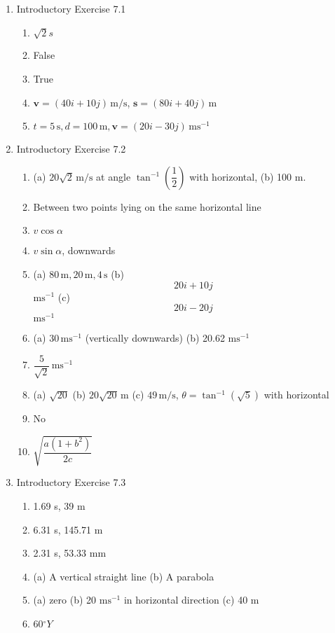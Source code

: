 \documentclass{article}
\renewcommand{\frac}[2]{\dfrac{#1}{#2}}
\begin{document}
\begin{enumerate}
    \item Introductory Exercise 7.1
    \begin{enumerate}
      \item $\sqrt{2} s$
      \item False
      \item True
      \item $\mathbf{v} = (40i + 10j) \, \text{m/s}$, $\mathbf{s} = (80i + 40j) \, \text{m}$
      \item $t = 5 \, \text{s}, d = 100 \, \text{m}, \mathbf{v} = (20i - 30j) \, \text{ms}^{-1}$
    \end{enumerate}
  
    \item Introductory Exercise 7.2
    \begin{enumerate}
      \item (a) $20\sqrt{2} \, \text{m/s}$ at angle $\tan^{-1}\left(\frac{1}{2}\right)$ with horizontal, (b) 100 m.
      \item Between two points lying on the same horizontal line
      \item $v \cos \alpha$
      \item $v \sin \alpha$, downwards
      \item (a) $80 \, \text{m}, 20 \, \text{m}, 4 \, \text{s}$ (b) \[20i + 10j\] $\text{ms}^{-1}$ (c) \[20i - 20j\] $\text{ms}^{-1}$
      \item (a) $30 \, \text{ms}^{-1}$ (vertically downwards) (b) 20.62 $\text{ms}^{-1}$
      \item $\frac{5}{\sqrt{2}} \, \text{ms}^{-1}$
      \item (a) $\sqrt{20}$ (b) $20\sqrt{20} \, \text{m}$ (c) $49 \, \text{m/s}$, $\theta = \tan^{-1}(\sqrt{5})$ with horizontal
      \item No
      \item $\sqrt{\frac{a(1+b^{2})}{2c}}$
    \end{enumerate}
  
    \item Introductory Exercise 7.3
    \begin{enumerate}
      \item 1.69 s, 39 m
      \item 6.31 s, 145.71 m
      \item 2.31 s, 53.33 mm
      \item (a) A vertical straight line (b) A parabola
      \item (a) zero (b) 20 $\text{ms}^{-1}$ in horizontal direction (c) 40 m
      \item 60$^{\circ}Y$
    \end{enumerate}
  \end{enumerate}
  
\end{document}
